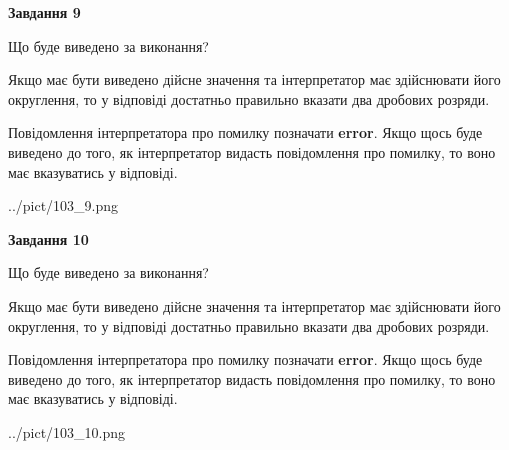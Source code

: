 \documentclass[12pt, ukrainian]{article}
\begin{document}
{\begin {Large}
{\begin {center}\textbf{Завдання 9}\end {center}}\par
Що буде виведено за виконання? \par

Якщо має бути виведено дійсне значення та інтерпретатор має здійснювати його округлення, 
то у відповіді достатньо правильно вказати два дробових розряди.

Повідомлення інтерпретатора про помилку позначати \textbf{error}.
Якщо щось буде виведено до того, як інтерпретатор видасть повідомлення про помилку, 
то воно має вказуватись у відповіді. \par

\begin{center}
	{../pict/103_9.png}
\end{center}
\newpage

{\begin {center}\textbf{Завдання 10}\end {center}}\par
Що буде виведено за виконання? \par

Якщо має бути виведено дійсне значення та інтерпретатор має здійснювати його округлення, 
то у відповіді достатньо правильно вказати два дробових розряди.

Повідомлення інтерпретатора про помилку позначати \textbf{error}.
Якщо щось буде виведено до того, як інтерпретатор видасть повідомлення про помилку, 
то воно має вказуватись у відповіді. \par

\begin{center}
	{../pict/103_10.png}
\end{center}
\newpage

\end {Large}}
\end{document}
